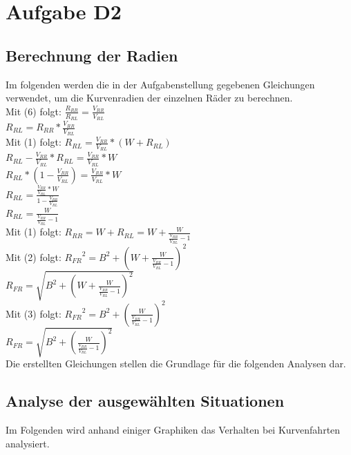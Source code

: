 \chapter{Aufgabe D2}

\section{Berechnung der Radien}
Im folgenden werden die in der Aufgabenstellung gegebenen Gleichungen verwendet, um die Kurvenradien der einzelnen Räder zu berechnen.\\

	Mit (6) folgt: $ \frac{R_{RR}}{R_{RL}} = \frac{V_{RR}}{V_{RL}}$  \\
	\hspace*{2.5cm}${R_{RL} = {R_{RR}} * \frac{V_{RR}}{V_{RL}}}$ \\
	Mit (1) folgt: ${R_{RL}} = \frac{V_{RR}}{V_{RL}} * (W+{R_{RL}})$ \\
	\hspace*{2.5cm}${R_{RL}}-\frac{V_{RR}}{V_{RL}}*{R_{RL}} = \frac{V_{RR}}{V_{RL}} * W$ \\
	\hspace*{2.5cm}${R_{RL}}*(1-\frac{V_{RR}}{V_{RL}})= \frac{V_{RR}}{V_{RL}} * W$ \\
	\hspace*{2.5cm}${R_{RL}}= \frac{\frac{V_{RR}}{V_{RL}} * W}{1-\frac{V_{RR}}{V_{RL}}}$ \\
	\hspace*{2.5cm}${R_{RL}}= \frac{W}{\frac{V_{RR}}{V_{RL}}-1}$ \\
	Mit (1) folgt: ${R_{RR}}= W + {R_{RL}} = W + \frac{W}{\frac{V_{RR}}{V_{RL}}-1}$ \\
	Mit (2) folgt: ${R_{FR}}^2= B^2 + (W + \frac{W}{\frac{V_{RR}}{V_{RL}}-1})^2$ \\
	\hspace*{2.5cm}${R_{FR}} = \sqrt{B^2 + (W + \frac{W}{\frac{V_{RR}}{V_{RL}}-1})^2}$ \\
	Mit (3) folgt: ${R_{FR}}^2= B^2 + (\frac{W}{\frac{V_{RR}}{V_{RL}}-1})^2$\\
	\hspace*{2.5cm}${R_{FR}} = \sqrt{B^2 + (\frac{W}{\frac{V_{RR}}{V_{RL}}-1})^2}$\\ 

Die erstellten Gleichungen stellen die Grundlage für die folgenden Analysen dar.
\newpage
\section{Analyse der ausgewählten Situationen}
	Im Folgenden wird anhand einiger Graphiken das Verhalten bei Kurvenfahrten analysiert.
	

